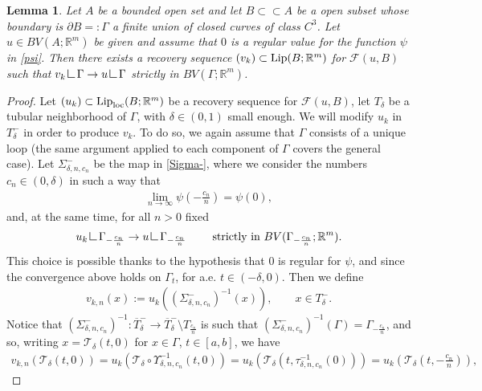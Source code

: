 \documentclass[a4paper,11pt]{article}
\numberwithin{equation}{section}
\newtheorem{lemma}[theorem]{Lemma}
\newcommand{\R}{\mathbb{R}}
\newcommand{\res}      {\mathop{\hbox{\vrule height 7pt width .5pt depth
                        0pt\vrule height .5pt width 6pt depth 0pt}}\nolimits}
\begin{document}
\begin{lemma}\label{lem_recoverymodified}
Let $A$ be a bounded open set and let $B\subset\subset A$ be a open subset whose boundary is $\partial B=:\Gamma$ a finite union of closed curves of class $C^3$. Let $u\in BV(A;\R^m)$ be given and assume that $0$ is a regular value for the function $\psi$ in \eqref{psi}. Then there exists a recovery sequence $(v_k)\subset  \text{{\rm Lip}}(B;\R^m)$ for $\mathcal F(u,B)$ such that $v_k\res\Gamma\rightarrow u\res \Gamma$ strictly in $BV(\Gamma;\R^m)$.
\end{lemma}
\begin{proof}
Let $(u_k)\subset \text{{\rm Lip}}_{\text{{\rm loc}}}(B;\R^m)$ be a recovery sequence for $\mathcal F(u,B)$, let $T_\delta$ be a tubular neighborhood of $\Gamma$, with $\delta\in(0,1)$ small enough. We will modify $u_k$ in $T_\delta^-$ in order to produce $v_k$. To do so, we again assume that $\Gamma$ consists of a unique loop (the same argument applied to each component of $\Gamma$  covers the general case). Let $\Sigma^-_{\delta,n,c_n}$ be the map in \eqref{Sigma-}, where we consider the numbers $c_n\in (0,\delta)$ in such a way that 
\begin{align}\label{limiteregolare}
\lim_{n\rightarrow \infty}\psi(-\frac{c_n}{n})=\psi(0),
\end{align}
and, at the same time, for all $n>0$ fixed
\begin{align*}
u_k\res\Gamma_{-\frac{c_n}{n}}\rightarrow u\res \Gamma_{-\frac{c_n}{n}}\qquad \text{ strictly in } BV(\Gamma_{-\frac{c_n}{n}};\R^m).
\end{align*}
This choice is possible thanks to the hypothesis that $0$ is regular for $\psi$, and since the convergence above holds on $\Gamma_t$, for a.e. $t\in (-\delta,0)$.
Then we define
\begin{align*}
	v_{k,n}(x):=u_k\left((\Sigma^-_{\delta,n,c_n})^{-1}(x)\right),\qquad x\in T_\delta^-.
\end{align*}
Notice that $(\Sigma^-_{\delta,n,c_n})^{-1}:\overline T_\delta^-\rightarrow \overline T_\delta^-\setminus T_{\frac{c_n}{n}}$ is such that $(\Sigma^-_{\delta,n,c_n})^{-1}(\Gamma)=\Gamma_{-\frac{c_n}{n}}$, and so, writing $x=\mathcal T_\delta(t,0)$ for $x\in \Gamma$, $t\in [a,b]$, we have 
\begin{align*}
	v_{k,n}(\mathcal T_\delta(t,0))=u_k(\mathcal T_\delta \circ \Upsilon^{-1}_{\delta,n,c_n}(t,0))=u_k(\mathcal T_\delta(t,\tau_{\delta,n,c_n}^{-1}(0)))=u_k(\mathcal T_\delta(t,-\frac{c_n}{n})),
\end{align*}

\end{proof}
\end{document}
